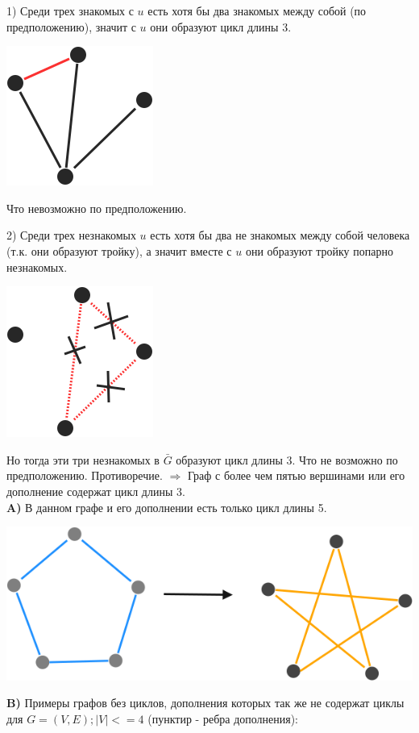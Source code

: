 \documentclass{article}
\begin{document}
1) Среди трех знакомых с $u$ есть хотя бы два знакомых между собой (по предположению), значит с  $u$ они образуют цикл длины 3.
 
\includegraphics[scale=0.5]{6_2.png}

Что невозможно по предположению.

2) Среди трех незнакомых $u$ есть хотя бы два не знакомых между собой человека (т.к. они образуют тройку), а значит вместе с $u$ они образуют тройку попарно незнакомых.

\includegraphics[scale=0.5]{6_3.png}

Но тогда эти три незнакомых в $\bar{G}$ образуют цикл длины 3.
Что не возможно по предположению.
Противоречие. $\Rightarrow$ Граф с более чем пятью вершинами или его дополнение содержат цикл длины 3.
\newpage
\\
\textbf{A)} В данном графе и его дополнении есть только цикл длины 5.

\includegraphics[scale=0.5]{6_4.png}

\textbf{B)} Примеры графов без циклов, дополнения которых так же не содержат циклы для $G = (V, E); |V| <= 4 $ (пунктир - ребра дополнения):
\end{document}
